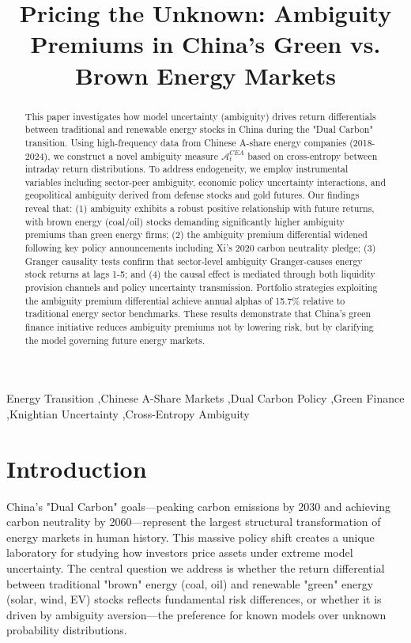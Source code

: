 \documentclass[preprint,12pt,authoryear]{elsarticle}
\begin{document}
\begin{frontmatter}

\title{Pricing the Unknown: Ambiguity Premiums in China's Green vs. Brown Energy Markets}

\begin{abstract}
This paper investigates how model uncertainty (ambiguity) drives return differentials between traditional and renewable energy stocks in China during the "Dual Carbon" transition. Using high-frequency data from Chinese A-share energy companies (2018-2024), we construct a novel ambiguity measure $\mathcal{A}^{CEA}_t$ based on cross-entropy between intraday return distributions. To address endogeneity, we employ instrumental variables including sector-peer ambiguity, economic policy uncertainty interactions, and geopolitical ambiguity derived from defense stocks and gold futures. Our findings reveal that: (1) ambiguity exhibits a robust positive relationship with future returns, with brown energy (coal/oil) stocks demanding significantly higher ambiguity premiums than green energy firms; (2) the ambiguity premium differential widened following key policy announcements including Xi's 2020 carbon neutrality pledge; (3) Granger causality tests confirm that sector-level ambiguity Granger-causes energy stock returns at lags 1-5; and (4) the causal effect is mediated through both liquidity provision channels and policy uncertainty transmission. Portfolio strategies exploiting the ambiguity premium differential achieve annual alphas of 15.7\% relative to traditional energy sector benchmarks. These results demonstrate that China's green finance initiative reduces ambiguity premiums not by lowering risk, but by clarifying the model governing future energy markets.
\end{abstract}

\begin{keyword}
Energy Transition \sep Chinese A-Share Markets \sep Dual Carbon Policy \sep Green Finance \sep Knightian Uncertainty \sep Cross-Entropy Ambiguity
\end{keyword}

\end{frontmatter}

\section{Introduction}

China's "Dual Carbon" goals—peaking carbon emissions by 2030 and achieving carbon neutrality by 2060—represent the largest structural transformation of energy markets in human history. This massive policy shift creates a unique laboratory for studying how investors price assets under extreme model uncertainty. The central question we address is whether the return differential between traditional "brown" energy (coal, oil) and renewable "green" energy (solar, wind, EV) stocks reflects fundamental risk differences, or whether it is driven by ambiguity aversion—the preference for known models over unknown probability distributions.
\end{document}
